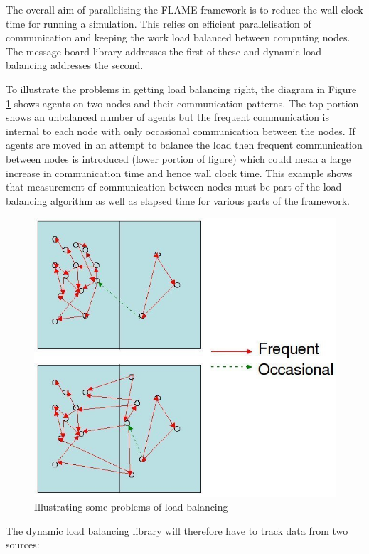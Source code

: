 
The overall aim of parallelising the FLAME framework is to reduce the wall clock time for running a simulation. This relies on efficient parallelisation of communication and keeping the work load balanced between computing nodes. The message board library addresses the first of these and dynamic load balancing addresses the second.

To illustrate the problems in getting load balancing right, the diagram in Figure \ref{fig:load_balance_problem} shows agents on two nodes and their communication patterns. The top portion shows an unbalanced number of agents but the frequent communication is internal to each node with only occasional communication between the nodes. If agents are moved in an attempt to balance the load then frequent communication between nodes is introduced (lower portion of figure) which could mean a large increase in communication time and hence wall clock time. This example shows that measurement of communication between nodes  must be part of the load balancing algorithm as well as elapsed time for various parts of the framework.

\begin{figure}[h]
 \centering
  \includegraphics[scale=0.50]{load_balance.jpg}
 \caption{Illustrating some problems of load balancing}
 \label{fig:load_balance_problem}
\end{figure}

The dynamic load balancing library will therefore have to track data from two sources:


